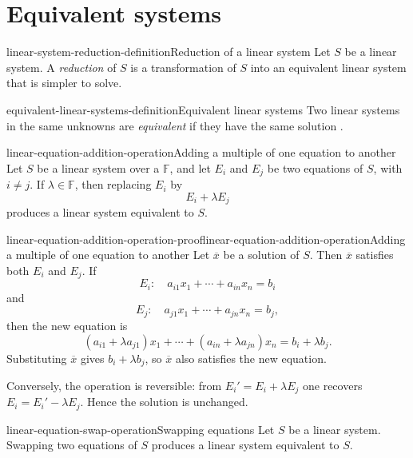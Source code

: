 \documentclass[preview]{standalone}
\begin{document}
\genpage

\section{Equivalent systems}

\begin{snippetdefinition}{linear-system-reduction-definition}{Reduction of a linear system}
    Let \(S\) be a linear system. A \emph{reduction} of \(S\) is a
    transformation of \(S\) into an equivalent linear system that is simpler
    to solve.
\end{snippetdefinition}

\begin{snippetdefinition}{equivalent-linear-systems-definition}{Equivalent linear systems}
    Two linear systems in the same unknowns are \emph{equivalent} if they have
    the same solution \set.
\end{snippetdefinition}

\begin{snippetlemma}{linear-equation-addition-operation}{Adding a multiple of one equation to another}
    Let \(S\) be a linear system over a \field \(\mathbb{F}\), and let
    \(E_i\) and \(E_j\) be two equations of \(S\), with \(i\neq j\).
    If \(\lambda\in\mathbb{F}\), then replacing \(E_i\) by
    \[
        E_i+\lambda E_j
    \]
    produces a linear system equivalent to \(S\).
\end{snippetlemma}

\begin{snippetproof}{linear-equation-addition-operation-proof}{linear-equation-addition-operation}{Adding a multiple of one equation to another}
    Let \(\overline{x}\) be a solution of \(S\). Then
    \(\overline{x}\) satisfies both \(E_i\) and \(E_j\). If
    \[
        E_i:\quad a_{i1}x_1+\cdots+a_{in}x_n=b_i
    \]
    and
    \[
        E_j:\quad a_{j1}x_1+\cdots+a_{jn}x_n=b_j,
    \]
    then the new equation is
    \[
        (a_{i1}+\lambda a_{j1})x_1+\cdots
        +(a_{in}+\lambda a_{jn})x_n
        =
        b_i+\lambda b_j.
    \]
    Substituting \(\overline{x}\) gives \(b_i+\lambda b_j\), so
    \(\overline{x}\) also satisfies the new equation.

    Conversely, the operation is reversible: from
    \(E_i'=E_i+\lambda E_j\) one recovers \(E_i=E_i'-\lambda E_j\). Hence
    the solution \set is unchanged.
\end{snippetproof}

\begin{snippetlemma}{linear-equation-swap-operation}{Swapping equations}
    Let \(S\) be a linear system. Swapping two equations of \(S\) produces a
    linear system equivalent to \(S\).
\end{snippetlemma}
\end{document}
